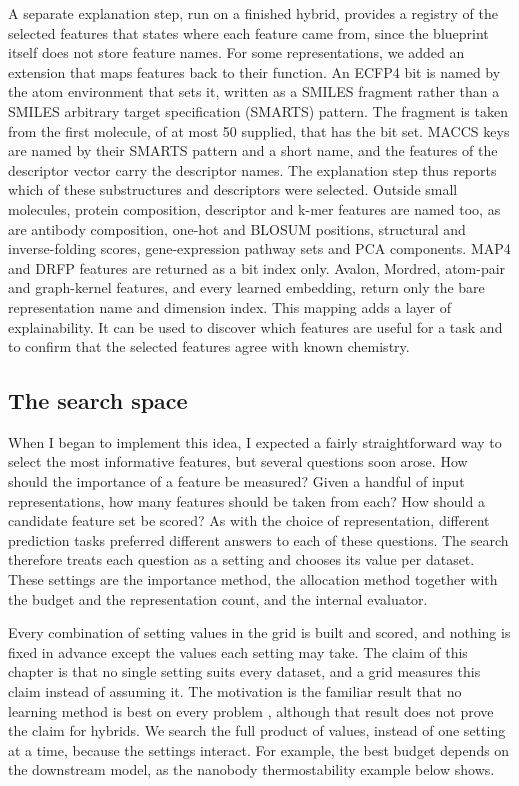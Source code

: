 A separate explanation step, run on a finished hybrid, provides a registry of the selected features that states where each feature came from, since the blueprint itself does not store feature names. For some representations, we added an extension that maps features back to their function. An ECFP4 bit is named by the atom environment that sets it, written as a SMILES fragment rather than a SMILES arbitrary target specification (SMARTS) pattern. The fragment is taken from the first molecule, of at most 50 supplied, that has the bit set. MACCS keys are named by their SMARTS pattern and a short name, and the features of the descriptor vector carry the descriptor names. The explanation step thus reports which of these substructures and descriptors were selected. Outside small molecules, protein composition, descriptor and k-mer features are named too, as are antibody composition, one-hot and BLOSUM positions, structural and inverse-folding scores, gene-expression pathway sets and PCA components. MAP4 and DRFP features are returned as a bit index only. Avalon, Mordred, atom-pair and graph-kernel features, and every learned embedding, return only the bare representation name and dimension index. This mapping adds a layer of explainability. It can be used to discover which features are useful for a task and to confirm that the selected features agree with known chemistry.

\subsection{The search space}

When I began to implement this idea, I expected a fairly straightforward way to select the most informative features, but several questions soon arose. How should the importance of a feature be measured? Given a handful of input representations, how many features should be taken from each? How should a candidate feature set be scored? As with the choice of representation, different prediction tasks preferred different answers to each of these questions. The search therefore treats each question as a setting and chooses its value per dataset. These settings are the importance method, the allocation method together with the budget and the representation count, and the internal evaluator.

Every combination of setting values in the grid is built and scored, and nothing is fixed in advance except the values each setting may take. The claim of this chapter is that no single setting suits every dataset, and a grid measures this claim instead of assuming it. The motivation is the familiar result that no learning method is best on every problem \citep{Wolpert1996}, although that result does not prove the claim for hybrids. We search the full product of values, instead of one setting at a time, because the settings interact. For example, the best budget depends on the downstream model, as the nanobody thermostability example below shows.

